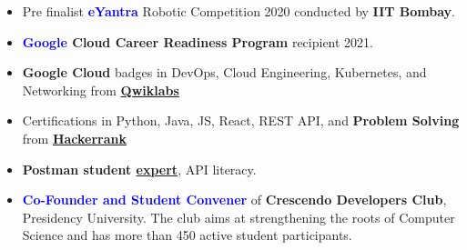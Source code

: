 \begin{itemize}
\item Pre finalist \textbf{\textcolor{blue}{eYantra}} Robotic Competition 2020 conducted by \textbf{IIT Bombay}.
\item \textbf{\textcolor{blue}{Google} Cloud Career Readiness Program} recipient 2021.
\item \textbf{Google Cloud} badges in DevOps, Cloud Engineering, Kubernetes, and Networking from \textbf{\textcolor{blue}{\href{https://www.qwiklabs.com/public_profiles/c11f5195-2ad0-4404-83c4-08ad982d139c}{Qwiklabs}}}
\item Certifications in Python, Java, JS, React, REST API, and \textbf{Problem Solving} from 
\textbf{\textcolor{blue}{\href{https://www.hackerrank.com/shaiqkar}{Hackerrank}}}
\item \textbf{Postman student \textcolor{blue}{\href{https://shrtst.herokuapp.com/R3io}{expert}}}, API literacy.
\end{itemize}
\smallskip

\begin{itemize}
\item \textbf{\textcolor{blue}{Co-Founder and Student Convener}} of \textbf{Crescendo Developers Club}, Presidency University. The club aims at strengthening the roots of Computer Science and has more than 450 active student participants.
\end{itemize}
